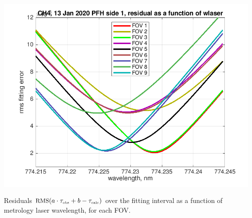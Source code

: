 \documentclass[10pt]{beamer}
\begin{document}
\begin{frame}
\begin{columns}[t]
\begin{column}{0.5\textwidth}
  \begin{centering}
  \includegraphics[width=\textwidth]{01-13_pfh_s1_CH4/CH4_wlaser_fit.png}
  \end{centering}\vspace{3mm}

Residuals $\mbox{\small RMS}(a\cdot\tau_{\mbox{\tiny obs}} + b - \tau_{\mbox{\tiny calc}})$ over the fitting
interval as a function of metrology laser wavelength, for each FOV.

\end{column}
\end{columns}
\end{frame}
\end{document}
